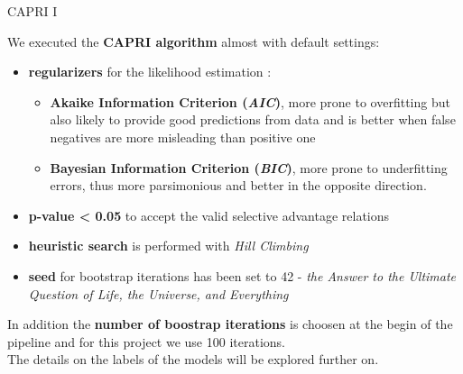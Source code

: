 \documentclass{beamer}
\begin{document}
\begin{frame}{CAPRI I}
  \begin{block}{}
    \small
    We executed the \textbf{CAPRI algorithm} \cite{capri} almost with default
    settings: 
    \begin{itemize}
      \item \textbf{regularizers} for the likelihood estimation \cite{picnic}:
      \begin{itemize}
        \item \textbf{Akaike Information Criterion (\textit{AIC})}, more prone
        to overfitting but also likely to provide good predictions from data and
        is better when false negatives are more misleading than positive one 
        \item \textbf{Bayesian Information Criterion (\textit{BIC})}, more prone
        to underfitting errors, thus more parsimonious and better in the
        opposite direction. 
      \end{itemize}
      \item \textbf{p-value < 0.05} to accept the valid selective advantage
      relations 
      \item \textbf{heuristic search} is performed with \textit{Hill Climbing}
      \item \textbf{seed} for bootstrap iterations has been set to 42 -
      \textit{the Answer to the Ultimate Question of Life, the Universe, and
        Everything} 
    \end{itemize}
    In addition the \textbf{number of boostrap iterations} is choosen at the
    begin of the pipeline and for this project we use 100 iterations.\\ 
    The details on the labels of the models will be explored further on.
  \end{block}
\end{frame}
\end{document}
